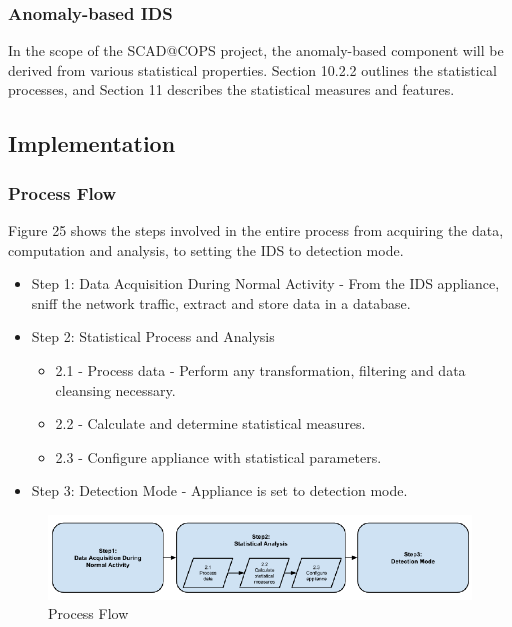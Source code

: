 \documentclass[12pt,]{article}
\begin{document}
\subsubsection{Anomaly-based IDS}\label{anomaly-based-ids}

In the scope of the SCAD@COPS project, the anomaly-based component will
be derived from various statistical properties. Section 10.2.2 outlines
the statistical processes, and Section 11 describes the statistical
measures and features.

\subsection{Implementation}\label{implementation}

\subsubsection{Process Flow}\label{process-flow}

Figure 25 shows the steps involved in the entire process from acquiring
the data, computation and analysis, to setting the IDS to detection
mode.

\begin{itemize}
\itemsep1pt\parskip0pt
\item
  Step 1: Data Acquisition During Normal Activity - From the IDS
  appliance, sniff the network traffic, extract and store data in a
  database.
\item
  Step 2: Statistical Process and Analysis

  \begin{itemize}
  \itemsep1pt\parskip0pt
  \item
    2.1 - Process data - Perform any transformation, filtering and data
    cleansing necessary.
  \item
    2.2 - Calculate and determine statistical measures.
  \item
    2.3 - Configure appliance with statistical parameters.
  \end{itemize}
\item
  Step 3: Detection Mode - Appliance is set to detection mode.
\end{itemize}

\begin{figure}

{\centering \includegraphics{thesis_files/figure-latex/unnamed-chunk-36-1} 

}

\caption{Process Flow}\label{fig:unnamed-chunk-36}
\end{figure}
\end{document}
